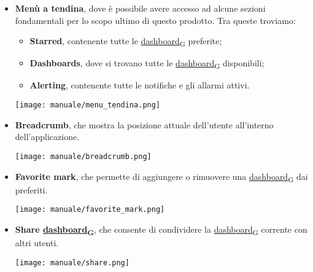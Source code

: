 \begin{itemize}
    \item \textbf{Menù a tendina}, dove è possibile avere accesso ad alcune sezioni fondamentali per lo scopo ultimo di questo prodotto. Tra queste troviamo:
        \begin{itemize}
            \item \textbf{Starred}, contenente tutte le \href{https://7last.github.io/docs/pb/documentazione-interna/glossario\#dashboard}{dashboard\textsubscript{G}} preferite;
            \item \textbf{Dashboards}, dove si trovano tutte le \href{https://7last.github.io/docs/pb/documentazione-interna/glossario\#dashboard}{dashboard\textsubscript{G}} disponibili;
            \item \textbf{Alerting}, contenente tutte le notifiche e gli allarmi attivi.
        \end{itemize}
        \begin{center}
            \texttt{[image: manuale/menu\_tendina.png]}
        \end{center}
    \item \textbf{Breadcrumb}, che mostra la posizione attuale dell'utente all'interno dell'applicazione.
        \begin{center}
            \texttt{[image: manuale/breadcrumb.png]}
        \end{center}
    \item \textbf{Favorite mark}, che permette di aggiungere o rimuovere una \href{https://7last.github.io/docs/pb/documentazione-interna/glossario\#dashboard}{dashboard\textsubscript{G}} dai preferiti.
        \begin{center}
            \texttt{[image: manuale/favorite\_mark.png]}
        \end{center}
    \item \textbf{Share \href{https://7last.github.io/docs/pb/documentazione-interna/glossario\#dashboard}{dashboard\textsubscript{G}}}, che consente di condividere la \href{https://7last.github.io/docs/pb/documentazione-interna/glossario\#dashboard}{dashboard\textsubscript{G}} corrente con altri utenti.
        \begin{center}
            \texttt{[image: manuale/share.png]}

\end{center}
\end{itemize}
